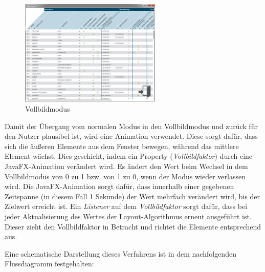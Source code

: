 \begin{figure}[H]
 \centering
 \includegraphics[width=0.6\textwidth]{grafiken/fullscreen.png}
 \caption{Vollbildmodus}
 \label{fig:fullscreenMode}
\end{figure}
Damit der Übergang vom normalen Modus in den Vollbildmodus und zurück für den Nutzer plausibel ist, wird eine Animation verwendet. Diese sorgt dafür, dass sich die äußeren Elemente aus dem Fenster bewegen, während das mittlere Element wächst. Dies geschieht, indem ein Property (\textit{Vollbildfaktor}) durch eine JavaFX-Animation verändert wird. Es ändert den Wert beim Wechsel in dem Vollbildmodus von 0 zu 1 bzw. von 1 zu 0, wenn der Modus wieder verlassen wird. Die JavaFX-Animation sorgt dafür, dass innerhalb einer gegebenen Zeitspanne (in diesem Fall 1 Sekunde) der Wert mehrfach verändert wird, bis der Zielwert erreicht ist. Ein \textit{Listener} auf dem \textit{Vollbildfaktor} sorgt dafür, dass bei jeder Aktualisierung des Wertes der Layout-Algorithmus erneut ausgeführt ist. Dieser zieht den Vollbildfaktor in Betracht und richtet die Elemente entsprechend aus.\par
Eine schematische Darstellung dieses Verfahrens ist in dem nachfolgenden Flussdiagramm festgehalten:
